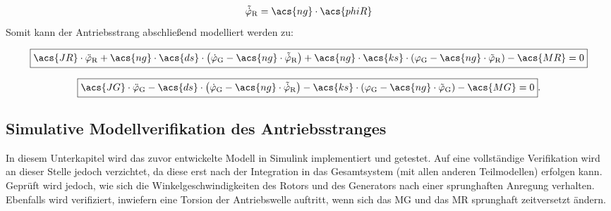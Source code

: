 \begin{align}
    \tilde{\dot\varphi}_{\mathrm{R}} = \acs{ng} \cdot \acs{phiR}
    \label{eq:Gleichung3.8}
\end{align}
\newline
Somit kann der Antriebsstrang abschließend modelliert werden zu:

\begin{equation}
    \label{eq:Gleichung3.9}
   \boxed{\acs{JR} \cdot \ddot{\varphi}_{\mathrm{R}} + \acs{ng} \cdot \acs{ds} \cdot \left( \dot\varphi_{\mathrm{G}} - \acs{ng} \cdot \tilde{\dot\varphi}_{\mathrm{R}}\right) + \acs{ng} \cdot \acs{ks} \cdot \left( \varphi_{\mathrm{G}} - \acs{ng} \cdot \tilde{\varphi}_{\mathrm{R}}\right) - \acs{MR} = 0}
\end{equation}

\begin{equation}
   \label{eq:Gleichung3.10}
   \boxed{\acs{JG} \cdot \ddot{\varphi}_{\mathrm{G}} - \acs{ds} \cdot \left( \dot\varphi_{\mathrm{G}} - \acs{ng} \cdot \tilde{\dot\varphi}_{\mathrm{R}}\right) - \acs{ks} \cdot \left( \varphi_{\mathrm{G}} - \acs{ng} \cdot \tilde{\varphi}_{\mathrm{G}}\right) - \acs{MG} = 0}.
\end{equation}
\clearpage

\subsection{Simulative Modellverifikation des Antriebsstranges}

In diesem Unterkapitel wird das zuvor entwickelte Modell in Simulink implementiert und getestet. Auf eine vollständige Verifikation wird an dieser Stelle jedoch verzichtet, da diese erst nach der Integration in das Gesamtsystem (mit allen anderen Teilmodellen) erfolgen kann. Geprüft wird jedoch, wie sich die Winkelgeschwindigkeiten des Rotors und des Generators nach einer sprunghaften Anregung verhalten. Ebenfalls wird verifiziert, inwiefern eine Torsion der Antriebswelle auftritt, wenn sich das \acl{MG} und das \acl{MR} sprunghaft zeitversetzt ändern. \\

